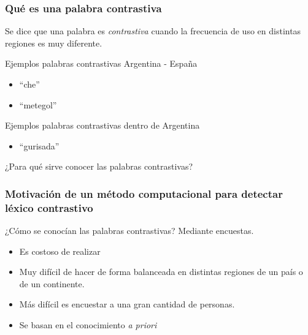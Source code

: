 
\begin{frame}[t]\frametitle{Qué es una palabra contrastiva}
    
    Se dice que una palabra es \textit{contrastiva} cuando la frecuencia de uso en distintas regiones es muy diferente. 

    \begin{block}{Ejemplos palabras contrastivas Argentina - España}
    \begin{itemize}
        \item ``che''
        \item ``metegol''
    \end{itemize}
    \end{block}

    \begin{block}{Ejemplos palabras contrastivas dentro de Argentina}
    \begin{itemize}
        \item ``gurisada''
    \end{itemize}
    \end{block}

¿Para qué sirve conocer las palabras contrastivas?

\end{frame}

\begin{frame}[t]\frametitle{Motivación de un método computacional para detectar léxico contrastivo}
    
¿Cómo se conocían las palabras contrastivas?
Mediante encuestas.
\begin{itemize}
    \item Es costoso de realizar
    \item Muy difícil de hacer de forma balanceada en distintas regiones de un país o de un continente.
    \item Más difícil es encuestar a una gran cantidad de personas.
    \item \alert{Se basan en el conocimiento \textit{a priori}}
\end{itemize}
\end{frame}